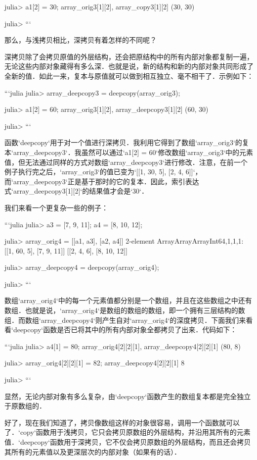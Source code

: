 julia> a1[2] = 30; array_orig3[1][2], array_copy3[1][2]
(30, 30)

julia> 
```

那么，与浅拷贝相比，深拷贝有着怎样的不同呢？

深拷贝除了会拷贝原值的外层结构，还会把原结构中的所有内部对象都复制一遍，无论这些内部对象藏得有多么深．也就是说，新的结构和新的内部对象共同形成了全新的值．如此一来，复本与原值就可以做到相互独立、毫不相干了．示例如下：

```julia 
julia> array_deepcopy3 = deepcopy(array_orig3);

julia> a1[2] = 60; array_orig3[1][2], array_deepcopy3[1][2]
(60, 30)

julia> 
```

函数`deepcopy`用于对一个值进行深拷贝．我利用它得到了数组`array_orig3`的复本`array_deepcopy3`．我虽然可以通过`a1[2] = 60`修改数组`array_orig3`中的元素值，但无法通过同样的方式对数组`array_deepcopy3`进行修改．注意，在前一个例子执行完之后，`array_orig3`的值已变为`[[1, 30, 5], [2, 4, 6]]`，而`array_deepcopy3`正是基于那时的它的复本．因此，索引表达式`array_deepcopy3[1][2]`的结果值才会是`30`．

我们来看一个更复杂一些的例子：

```julia
julia> a3 = [7, 9, 11]; a4 = [8, 10, 12];

julia> array_orig4 = [[a1, a3], [a2, a4]]
2-element Array{Array{Array{Int64,1},1},1}:
 [[1, 60, 5], [7, 9, 11]]
 [[2, 4, 6], [8, 10, 12]]

julia> array_deepcopy4 = deepcopy(array_orig4);

julia> 
```

数组`array_orig4`中的每一个元素值都分别是一个数组，并且在这些数组之中还有数组．也就是说，`array_orig4`是数组的数组的数组，即一个拥有三层结构的数组．而数组`array_deepcopy4`则产生自对`array_orig4`的深度拷贝．下面我们来看看`deepcopy`函数是否已将其中的所有内部对象全都拷贝了出来．代码如下：

```julia
julia> a4[1] = 80; array_orig4[2][2][1], array_deepcopy4[2][2][1]
(80, 8)

julia> array_orig4[2][2][1] = 82; array_deepcopy4[2][2][1]
8

julia> 
```

显然，无论内部对象有多么复杂，由`deepcopy`函数产生的数组复本都是完全独立于原数组的．

好了，现在我们知道了，拷贝像数组这样的对象很容易，调用一个函数就可以了．`copy`函数用于浅拷贝，它只会拷贝原数组的外层结构，并沿用其所有的元素值．`deepcopy`函数用于深拷贝，它不仅会拷贝原数组的外层结构，而且还会拷贝其所有的元素值以及更深层次的内部对象（如果有的话）．